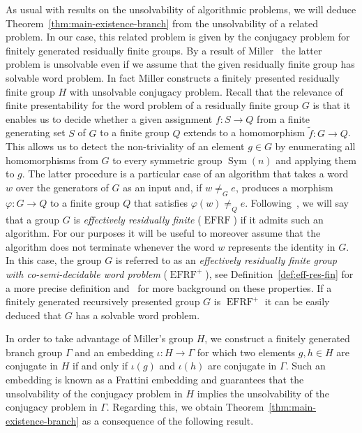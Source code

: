 \documentclass[a4paper]{amsart}
\numberwithin{equation}{section}
\theoremstyle{definition}
\theoremstyle{remark}
\DeclareMathOperator{\EFRF}{EFRF}
\DeclareMathOperator{\Sym}{Sym}
\begin{document}
As usual with results on the unsolvability of algorithmic problems, we will deduce Theorem~\ref{thm:main-existence-branch} from the unsolvability of a related problem.
In our case, this related problem is given by the conjugacy problem for finitely generated residually finite groups.
By a result of Miller~\cite[Theorem~9 on p.~31]{Miller1971} the latter problem is unsolvable even if we assume that the given residually finite group has solvable word problem.
In fact Miller constructs a finitely presented residually finite group $H$ with unsolvable conjugacy problem.
Recall that the relevance of finite presentability for the word problem of a residually finite group $G$ is that it enables us to decide whether a given assignment $f \colon S \rightarrow Q$ from a finite generating set $S$ of $G$ to a finite group $Q$ extends to a homomorphism $\widetilde{f} \colon G \rightarrow Q$.
This allows us to detect the non-triviality of an element $g \in G$ by enumerating all homomorphisms from $G$ to every symmetric group $\Sym(n)$ and applying them to $g$.
The latter procedure is a particular case of an algorithm that takes a word $w$ over the generators of $G$ as an input and, if $w \neq_G e$, produces a morphism $\varphi \colon G \rightarrow Q$ to a finite group $Q$ that satisfies $\varphi(w) \neq_Q e$.
Following~\cite{Rauzy2021}, we will say that a group $G$ is \emph{effectively residually finite} ($\EFRF$) if it admits such an algorithm.
For our purposes it will be useful to moreover assume that the algorithm does not terminate whenever the word $w$ represents the identity in $G$.
In this case, the group $G$ is referred to as an \emph{effectively residually finite group with co-semi-decidable word problem} ($\EFRF^{+}$), see Definition~\ref{def:eff-res-fin} for a more precise definition and~\cite{Rauzy21Computable,Rauzy2021} for more background on these properties.
If a finitely generated recursively presented group $G$ is $\EFRF^{+}$ it can be easily deduced that $G$ has a solvable word problem.

In order to take advantage of Miller's group $H$, we construct a finitely generated branch group $\Gamma$ and an embedding $\iota \colon H \rightarrow \Gamma$ for which two elements $g,h \in H$ are conjugate in $H$ if and only if $\iota(g)$ and $\iota(h)$ are conjugate in $\Gamma$.
Such an embedding is known as a Frattini embedding and guarantees that the unsolvability of the conjugacy problem in $H$ implies the unsolvability of the conjugacy problem in $\Gamma$.
Regarding this, we obtain Theorem~\ref{thm:main-existence-branch} as a consequence of the following result.
\end{document}

